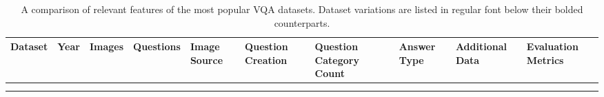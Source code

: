\begin{landscape}
  \begin{footnotesize}
      \begin{center}
        \begin{longtable}[c]{llllllllll}
          \toprule
          \textbf{Dataset}
          & \textbf{Year}
          & \textbf{Images}
          & \textbf{Questions}
          & \textbf{Image Source}
          & \textbf{Question Creation}
          & \textbf{Question Category Count}
          & \textbf{Answer Type}
          & \textbf{Additional Data}
          & \textbf{Evaluation Metrics}\\
          \midrule
          \endhead

          \midrule
          \endfoot

          \bottomrule\\
          \caption[A comparison of VQA datasets and their variations.]{A comparison of relevant features of the most popular VQA datasets. Dataset variations are listed in regular font below their bolded counterparts.}
          \label{tab:dataset_comparison}
          \endlastfoot


\end{longtable}
\end{center}
\end{footnotesize}
\end{landscape}
